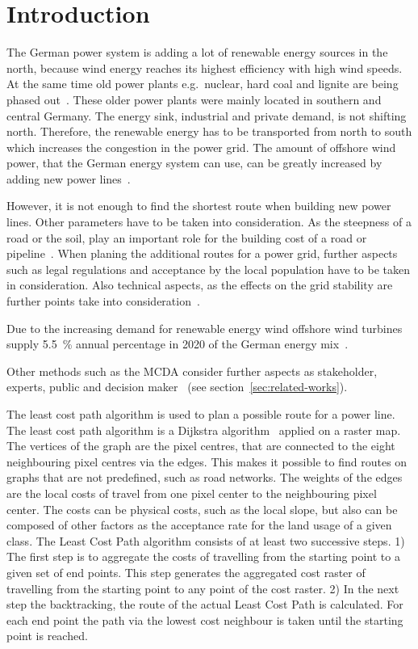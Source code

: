 \documentclass[acmtog]{acmart}
\begin{document}
	\section{Introduction}\label{sec:introduction}

	The German power system is adding a lot of renewable energy sources in the north, because wind energy reaches its highest efficiency with high wind speeds.
	At the same time old power plants e.g.\ nuclear, hard coal and lignite are being phased out~\cite{eser-frey_analyzing_2012}.
	These older power plants were mainly located in southern and central Germany. 
	The energy sink,  industrial and private demand, is not shifting north.
	Therefore, the renewable energy has to be transported from north to south which increases the congestion in the power grid. 
	The amount of offshore wind power, that the German energy system can use, can be greatly increased by adding new power lines~\cite{leuthold_nodal_2005}.
	
	However, it is not enough to find the shortest route when building new power lines.
	Other parameters have to be taken into consideration.
	As the steepness of a road or the soil, play an important role for the building cost of a road or pipeline~\cite{suleiman_optimal_2015}.
	When planing the additional routes for a power grid, further aspects such as legal regulations and acceptance
	by the local population have to be taken in consideration.
	Also technical aspects, as the effects on the grid stability are further points take into consideration~\cite{schafer_understanding_2022}.
	
	Due to the increasing demand for renewable energy wind offshore wind turbines supply 5.5~\% annual percentage in 2020 of the German energy mix~\cite{noauthor_nettostromerzeugung_2021}.

	Other methods such as the \acrfull{MCDA}  consider further aspects as stakeholder, experts, public and decision maker~\cite{bertsch_participatory_2016} (see section~\ref{sec:related-works}).
	
	The least cost path algorithm is used to plan a possible route for a power line.
	The least cost path algorithm is a Dijkstra algorithm~\cite{dijkstra_note_1959} applied on a raster map.
	The vertices of the graph are the pixel centres, that are connected to the eight neighbouring pixel centres via the edges.
	This makes it possible to find routes on graphs that are not predefined, such as road networks.
	The weights of the edges are the local costs of travel from one pixel center to the neighbouring pixel center.
	The costs can be physical costs, such as the local slope, but also can be composed of other factors as the acceptance rate for the land usage of a given class.
	The Least Cost Path algorithm consists of at least two successive steps.
	1) The first step is to aggregate the costs of travelling from the starting point to a given set of end points.
	This step generates the aggregated cost raster of travelling from the starting point to any point of the cost raster.
	2) In the next step the backtracking, the route of the actual Least Cost Path is calculated.
	For each end point the path via the lowest cost neighbour is taken until the starting point is reached.
	
\end{document}
